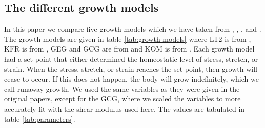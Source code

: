 \subsection{The different growth models}
\label{sub:different models} 
In this paper we compare five growth models which we have taken from \citep{Taber1998}, \citep{Kroon2009}, \citep{Goktepe}, and \citep{Kerckhoffs2012}. The growth models are given in table \ref{tab:growth models} where LT2 is from \citep{Taber1998}, KFR is from \citep{Kroon2009}, GEG and GCG are from \citep{Goktepe} and KOM is from \citep{Kerckhoffs2012}. Each growth model had a set point that either determined the homeostatic level of stress, stretch, or strain. When the stress, stretch, or strain reaches the set point, then growth will cease to occur. If this does not happen, the body will grow indefinitely, which we call runaway growth. We used the same variables as they were given in the original papers, except for the GCG, where we scaled the variables to more accurately fit with the shear modulus used here. The values are tabulated in table \ref{tab:parameters}.
